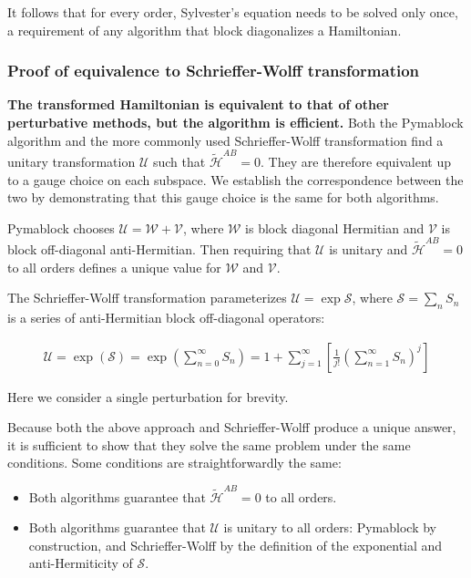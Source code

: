 \documentclass[submission, Codebases]{SciPost}
\begin{document}
{{It follows that for every order, Sylvester's equation needs to be solved
only once, a requirement of any algorithm that block diagonalizes a Hamiltonian.

\subsubsection{Proof of equivalence to Schrieffer-Wolff transformation}

\textbf{The transformed Hamiltonian is equivalent to that of other perturbative
methods, but the algorithm is efficient.}
Both the Pymablock algorithm and the more commonly used Schrieffer-Wolff
transformation find a unitary transformation $\mathcal{U}$ such that
$\tilde{\mathcal{H}}^{AB}=0$.
They are therefore equivalent up to a gauge choice on each subspace.
We establish the correspondence between the two by demonstrating that this gauge
choice is the same for both algorithms.

Pymablock chooses $\mathcal{U}=\mathcal{W}+\mathcal{V}$, where $\mathcal{W}$ is
block diagonal Hermitian and $\mathcal{V}$ is block off-diagonal
anti-Hermitian.
Then requiring that $\mathcal{U}$ is unitary and $\tilde{\mathcal{H}}^{AB}=0$
to all orders defines a unique value for $\mathcal{W}$ and $\mathcal{V}$.

The Schrieffer-Wolff transformation parameterizes $\mathcal{U} = \exp
\mathcal{S}$, where $\mathcal{S} = \sum_n S_n$ is a series of
anti-Hermitian block off-diagonal operators:

\begin{equation}
\label{exp_s_expansion}
\begin{align}
\mathcal{U} = \exp{\left(\mathcal{S}\right)}=\exp{\left(\sum_{n=0}^\infty
S_n\right)} = 1+\sum_{j=1}^\infty \left[\frac{1}{j!}
\left(\sum_{n=1}^\infty S_n\right)^j\right]
\end{align}
\end{equation}

Here we consider a single perturbation for brevity.

Because both the above approach and Schrieffer-Wolff produce a unique answer, it
is sufficient to show that they solve the same problem under the same
conditions.
Some conditions are straightforwardly the same:

\begin{itemize}
\item Both algorithms guarantee that $\tilde{\mathcal{H}}^{AB} = 0$ to all orders.
\item Both algorithms guarantee that $\mathcal{U}$ is unitary to all orders:
Pymablock by construction, and Schrieffer-Wolff by the
definition of the exponential and anti-Hermiticity of $\mathcal{S}$.
\end{itemize}

}}
\end{document}
